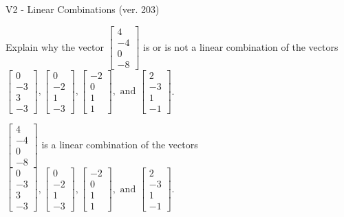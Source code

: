 \begin{exercise}
  \begin{exerciseTitle}V2 - Linear Combinations (ver. 203)\end{exerciseTitle}
  \begin{exerciseStatement}
    Explain why the vector \(\left[\begin{array}{c}
4 \\
-4 \\
0 \\
-8
\end{array}\right]\)  is or is not a linear 
	combination of the vectors \(\left[\begin{array}{c}
0 \\
-3 \\
3 \\
-3
\end{array}\right] , \left[\begin{array}{c}
0 \\
-2 \\
1 \\
-3
\end{array}\right] , \left[\begin{array}{c}
-2 \\
0 \\
1 \\
1
\end{array}\right] , \text{ and } \left[\begin{array}{c}
2 \\
-3 \\
1 \\
-1
\end{array}\right]\).
	


  \end{exerciseStatement}
  \begin{exerciseAnswer}
   \(\left[\begin{array}{c}
4 \\
-4 \\
0 \\
-8
\end{array}\right]\) 
  	 is  
	a linear combination of the vectors \(\left[\begin{array}{c}
0 \\
-3 \\
3 \\
-3
\end{array}\right] , \left[\begin{array}{c}
0 \\
-2 \\
1 \\
-3
\end{array}\right] , \left[\begin{array}{c}
-2 \\
0 \\
1 \\
1
\end{array}\right] , \text{ and } \left[\begin{array}{c}
2 \\
-3 \\
1 \\
-1
\end{array}\right]\).


\end{exerciseAnswer}
\end{exercise}
